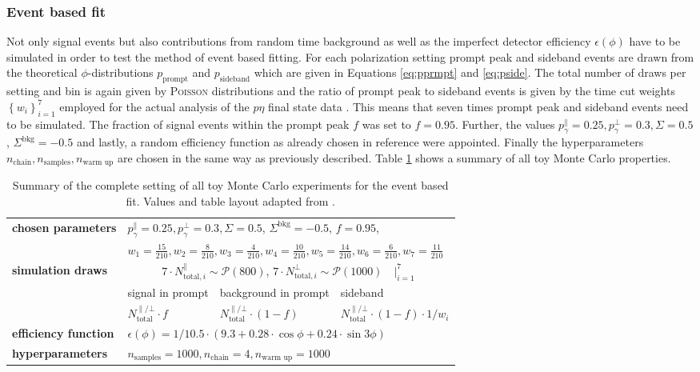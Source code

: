\subsubsection{Event based fit}
Not only signal events but also contributions from random time background as well as the imperfect detector efficiency $\epsilon(\phi)$ have to be simulated in order to test the method of event based fitting. For each polarization setting prompt peak and sideband events are drawn from the theoretical $\phi$-distributions $p_\text{prompt}$ and $p_\text{sideband}$ which are given in Equations \eqref{eq:pprmpt} and \eqref{eq:pside}. The total number of draws per setting and bin is again given by \textsc{Poisson} distributions and the ratio of prompt peak to sideband events is given by the time cut weights $\left\{w_i\right\}_{i=1}^7$ employed for the actual analysis of the $p\eta$ final state data \cite{farahphd}. This means that seven times prompt peak and sideband events need to be simulated. The fraction of signal events within the prompt peak $f$ was set to $f=0.95$. Further, the values $p_\gamma^\parallel=0.25,p_\gamma^\bot=0.3,\Sigma=0.5$, $\Sigma^\text{bkg}=-0.5$ and lastly, a random efficiency function as already chosen in reference \cite{farahphd} were appointed. Finally the hyperparameters $n_\text{chain},n_\text{samples},n_\text{warm up}$ are chosen in the same way as previously described. Table \ref{tab:mcsum} shows a summary of all toy Monte Carlo properties.
\begin{table}[htbp]

	\renewcommand{\arraystretch}{1.5}
	\centering
	\begin{tabularx}{\linewidth}{l|XXX}
		\toprule
		\textbf{chosen parameters} & \multicolumn{3}{l}{$p_\gamma^\parallel=0.25,p_\gamma^\bot=0.3,\Sigma=0.5$, $\Sigma^\text{bkg}=-0.5$, $f=0.95$,}\\ &\multicolumn{3}{l}{$w_1=\frac{15}{210},w_2=\frac{8}{210},w_3=\frac{4}{210},w_4=\frac{10}{210},w_5=\frac{14}{210},w_6=\frac{6}{210},w_7=\frac{11}{210}$}\\
		\hline
		\textbf{simulation draws} &\multicolumn{3}{c}{$7\cdot N^\parallel_{\text{total},i}\sim\mathcal{P}(800)$, $7\cdot N^\bot_{\text{total},i}\sim\mathcal{P}(1000)\quad\big|_{i=1}^7$}\\
		\cline{2-4}
		&signal in prompt&background in prompt& sideband \\
		&$N^{\parallel/\bot}_\text{total}\cdot f$&$N^{\parallel/\bot}_\text{total}\cdot\left(1-f\right)$&$N^{\parallel/\bot}_\text{total}\cdot\left(1-f\right)\cdot1/w_i$\\
		\hline
		\textbf{efficiency function}&\multicolumn{3}{l}{$\epsilon\left(\phi\right)=1/10.5\cdot\left(9.3+0.28\cdot\cos\phi+0.24\cdot\sin3\phi\right)$}\\
		\hline
		\textbf{hyperparameters}&\multicolumn{3}{l}{$n_\text{samples}=1000,n_\text{chain}=4,n_\text{warm up}=1000$}\\
		\bottomrule
	\end{tabularx}
	\caption{Summary of the complete setting of all toy Monte Carlo experiments for the event based fit. Values and table layout adapted from \cite{farahphd}.}
	\label{tab:mcsum}
\end{table}
